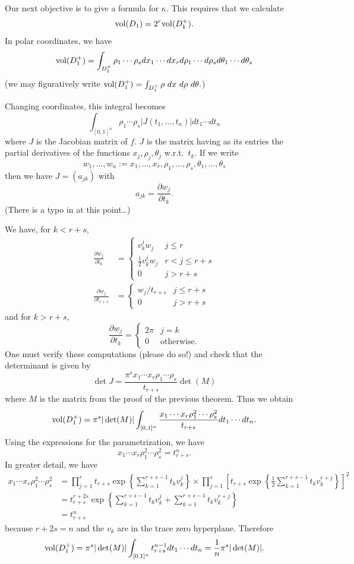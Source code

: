 \documentclass[10pt,a4paper,reqno]{amsart}
\begin{document}
\begin{ap}
Our next objective is to give a formula for $\kappa.$ This requires that we
calculate \[\mathrm{vol}(D_1) = 2^r \mathrm{vol}(D_1^+).\] In polar coordinates, we have
\[\mathrm{vol}(D_1^+) = \int_{D_1^+} \rho_1 \cdots \rho_s dx_1 \cdots dx_r d\rho_1
\cdots d\rho_s d\theta_1 \cdots d\theta_s\] (we may figuratively write
$\vol(D_1^+) = \int_{D_1^+} \rho\ dx\ d\rho\ d\theta.$)

Changing coordinates, this integral becomes \[\int_{[0,1]^n} \rho_1 \cdots
\rho_s |J(t_1,\dots,t_n)| dt_1 \cdots dt_n\] where $J$ is the Jacobian matrix
of $f$. $J$ is the matrix having as its entries the partial derivatives of the
functions $x_j,\rho_j,\theta_j$ w.r.t.~$t_k.$ If we write \[w_1,\dots,w_n :=
x_1,\dots,x_r,\rho_1,\dots,\rho_s,\theta_1,\dots,\theta_s\] then we have $J =
(a_{jk})$ with \[a_{jk} = \frac{\partial w_j}{ \partial t_k}.\] (There is a
typo in \cite{M} at this point\dots)

We have, for $k < r+s$,
\begin{align*}
\frac{\partial w_j}{
\partial t_k} & = \begin{cases}
    v_k^j w_j & j \le r \\
    \frac{1}{2} v_k^j w_j & r < j \le r+s \\
    0 & j > r+s
\end{cases} \\
\frac{\partial w_j}{
\partial t_{r+s}} & = \begin{cases}
    w_j/t_{r+s} & j \le r+s\\
    0 & j > r+s
\end{cases}
\end{align*}
and for $k > r+s,$
\[ \frac{\partial w_j}{
\partial t_{k}} = \begin{cases}
    2\pi & j = k\\
    0 & \text{otherwise}.
\end{cases}\] One must verify these computations (please do so!) and check that
the determinant is given by \[\det J = \frac{\pi^s x_1 \cdots x_r \rho_1 \cdots
\rho_s}{t_{r+s}} \det(M)\] where $M$ is the matrix from the proof of the
previous theorem. Thus we obtain \[\mathrm{vol}(D_1^+) = \pi^s |\det(M)| \int_{[0,1]^n}
\frac{x_1 \cdots x_r \rho_1^2 \cdots \rho_s^2}{t_{r+s}} dt_1 \cdots dt_n.\]
Using the expressions for the parametrization, we have \[x_1 \cdots x_r
\rho_1^2 \cdots \rho_s^2 = t_{r+s}^n.\] In greater detail, we have
\begin{align*}
    x_1 \cdots x_r \rho_1^2 \cdots \rho_s^2 & = \prod_{j=1}^r
    t_{r+s}\exp\left\{\sum_{k=1}^{r+s-1} t_k v_k^j  \right\} \times
    \prod_{j=1}^s
    \left[
    t_{r+s}\exp\left\{\frac{1}{2}\sum_{k=1}^{r+s-1}t_k v_k^{r+j}\right\}
    \right]^2 \\
    & = t_{r+s}^{r+2s} \exp\left\{
    \sum_{k=1}^{r+s-1} t_k v_k^j +
    \sum_{k=1}^{r+s-1}t_k v_k^{r+j}
    \right\}\\
    & = t_{r+s}^n
\end{align*} because $r+2s = n$ and the $v_k$ are in the trace zero hyperplane.
Therefore \[ \mathrm{vol}(D_1^+) = \pi^s | \det(M) | \int_{[0,1]^n} t_{r+s}^{n-1} dt_1
\cdots dt_n = \frac{1}{n} \pi^s |\det(M)|.\]


\end{ap}
\end{document}
